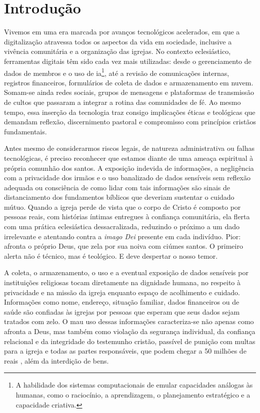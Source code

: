 \newcommand{\tituloIntroducao}{Introdução}

\chapter*{\tituloIntroducao}
\markboth{\tituloIntroducao}{\tituloIntroducao}
\addcontentsline{toc}{section}{\MakeUppercase{\tituloIntroducao}}

Vivemos em uma era marcada por avanços tecnológicos acelerados, em que a digitalização atravessa todos os aspectos da vida em sociedade, inclusive a vivência comunitária e a organização das igrejas. No contexto eclesiástico, ferramentas digitais têm sido cada vez mais utilizadas: desde o gerenciamento de dados de membros e o uso de \gls{ia}\footnote{A habilidade dos sistemas computacionais de emular capacidades análogas às humanas, como o raciocínio, a aprendizagem, o planejamento estratégico e a capacidade criativa.}, até a revisão de comunicações internas, registros financeiros, formulários de coleta de dados e armazenamento em nuvem. Somam-se ainda redes sociais, grupos de mensagens e plataformas de transmissão de cultos que passaram a integrar a rotina das comunidades de fé. Ao mesmo tempo, essa inserção da tecnologia traz consigo implicações éticas e teológicas que demandam reflexão, discernimento pastoral e compromisso com princípios cristãos fundamentais.

Antes mesmo de considerarmos riscos legais, de natureza administrativa ou falhas tecnológicas, é preciso reconhecer que estamos diante de uma ameaça espiritual à própria comunhão dos santos. A exposição indevida de informações, a negligência com a privacidade dos irmãos e o uso banalizado de dados sensíveis sem reflexão adequada  ou consciência de como lidar com tais informações são sinais de distanciamento dos fundamentos bíblicos que deveriam sustentar o cuidado mútuo. Quando a igreja perde de vista que o corpo de Cristo é composto por pessoas reais, com histórias íntimas entregues à confiança comunitária, ela flerta com uma prática eclesiástica dessacralizada, reduzindo o próximo a um dado irrelevante e atentando contra a \textit{imago Dei} presente em cada indivíduo. Pior: afronta o próprio Deus, que zela por sua noiva com ciúmes santos. O primeiro alerta não é técnico, mas é teológico. E deve despertar o nosso temor.

A coleta, o armazenamento, o uso e a eventual exposição de dados sensíveis por instituições religiosas tocam diretamente na dignidade humana, no respeito à privacidade e na missão da igreja enquanto espaço de acolhimento e cuidado. Informações como nome, endereço, situação familiar, dados financeiros ou de saúde são confiadas às igrejas por pessoas que esperam que seus dados sejam tratados com zelo. O mau uso dessas informações caracteriza-se não apenas como afronta a Deus, mas também como violação da segurança individual, da confiança relacional e da integridade do testemunho cristão, passível de punição com multas para a igreja e todas as partes responsáveis, que podem chegar a 50 milhões de reais \cite[art.~52, II]{lgpd2018}, além da interdição de bens. 

